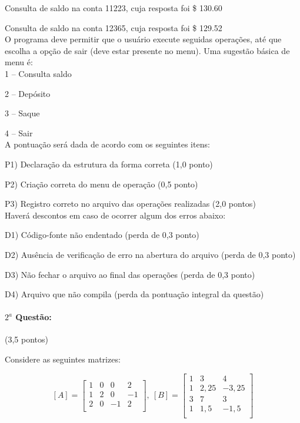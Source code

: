 \documentclass[12pt,a4paper]{article}
\begin{document}
Consulta de saldo na conta 11223, cuja resposta foi \$ 130.60

Consulta de saldo na conta 12365, cuja resposta foi \$ 129.52\\

O programa deve permitir que o usuário execute seguidas operações, até que escolha a opção de sair
(deve estar presente no menu). Uma sugestão básica de menu é:\\

1 – Consulta saldo

2 – Depósito

3 – Saque

4 – Sair\\

A pontuação será dada de acordo com os seguintes itens:

P1) Declaração da estrutura da forma correta (1,0 ponto)

P2) Criação correta do menu de operação (0,5 ponto)

P3) Registro correto no arquivo das operações realizadas (2,0 pontos)\\

Haverá descontos em caso de ocorrer algum dos erros abaixo:

D1) Código-fonte não endentado (perda de 0,3 ponto)

D2) Ausência de verificação de erro na abertura do arquivo (perda de 0,3 ponto)

D3) Não fechar o arquivo ao final das operações (perda de 0,3 ponto)

D4) Arquivo que não compila (perda da pontuação integral da questão)

\paragraph{$2^a$ Questão:} (3,5 pontos)

Considere as seguintes matrizes:

$$ [A]=\left[
\begin{array}{cccc}
1 & 0 & 0 & 2 \\
1 & 2 & 0 & -1 \\
2 & 0 & -1 & 2 \\
\end{array}
\right], \ [B]= \left[ 
\begin{array}{ccc}
1 & 3 & 4 \\
1 & 2,25 & -3,25 \\
3 & 7 & 3 \\
1 & 1,5 & -1,5 \\
\end{array}
\right]
$$
\end{document}
